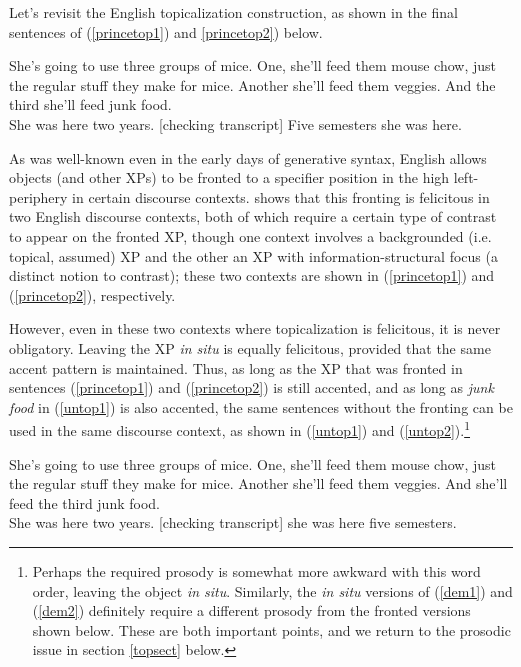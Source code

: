 Let's revisit the English topicalization construction, as shown in the final sentences of (\ref{princetop1}) and \ref{princetop2}) below.

\begin{exe}
\ex \label{princetop1} She's going to use three groups of mice.
One, she'll feed them mouse chow, just the regular stuff they make for
mice.
Another she'll feed them veggies.
And the third she'll feed junk food.\\

\ex \label{princetop2} She was here two years.
[checking transcript] Five semesters she was here.\\
\citep[][8,9]{prince1999} 

\end{exe}

\noindent As was well-known even in the early days of generative syntax, English allows objects (and other XPs) to be fronted to a specifier position in the high left-periphery in certain discourse contexts.
\citet{prince1985,prince1998, prince1999} shows that this fronting is felicitous in two English discourse contexts, both of which require a certain type of contrast to appear on the fronted XP, though one context involves a backgrounded (i.e. topical, assumed) XP and the other an XP with information-structural focus (a distinct notion to contrast); these two contexts are shown in (\ref{princetop1}) and (\ref{princetop2}), respectively.

However, even in these two contexts where topicalization is felicitous, it is never obligatory.
Leaving the XP \textsl{in situ} is equally felicitous, provided that the same accent pattern is maintained.
Thus, as long as the XP that was fronted in sentences (\ref{princetop1}) and (\ref{princetop2}) is still accented, and as long as \textsl{junk food} in (\ref{untop1}) is also accented, the same sentences without the fronting can be used in the same discourse context, as shown in (\ref{untop1}) and (\ref{untop2}).\footnote{Perhaps the required prosody is somewhat more awkward with this word order, leaving the object \textsl{in situ}.
Similarly, the \textsl{in situ} versions of (\ref{dem1}) and (\ref{dem2}) definitely require a different prosody from the fronted versions shown below.
These are both important points, and we return to the prosodic issue in section \ref{topsect} below.} 

\begin{exe}
\ex \label{untop1} She's going to use three groups of mice.
One, she'll feed them mouse chow, just the regular stuff they make for
mice.
Another she'll feed them veggies.
And she'll feed the third junk food.\\

\ex \label{untop2} She was here two years.
[checking transcript] she was here five semesters.\\

\end{exe}


